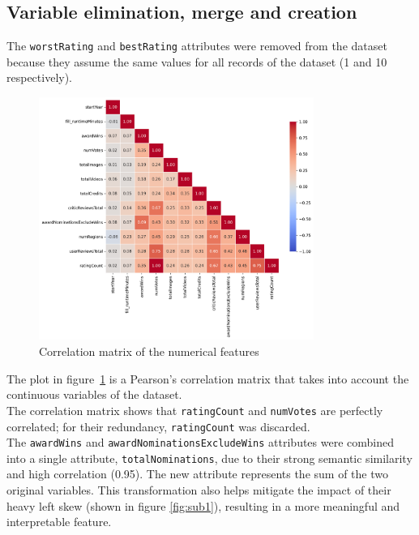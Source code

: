 \subsection{Variable elimination, merge and creation}\label{sec:var_elim_creation}
The \texttt{worstRating} and \texttt{bestRating} attributes were removed from the dataset because they
assume the same values for all records of the dataset (1 and 10 respectively).\\

\begin{figure}[H]
    \centering
    \includegraphics[width=0.8\textwidth]{plots/correlation_matrix.png}
    \caption{Correlation matrix of the numerical features}
    \label{fig:correlation_matrix}
\end{figure}

The plot in figure~\ref{fig:correlation_matrix} is a Pearson's correlation matrix that takes into
account the continuous variables of the dataset.\\

The correlation matrix shows that \texttt{ratingCount} and \texttt{numVotes} are perfectly correlated;
for their redundancy, \texttt{ratingCount} was discarded.\\

The \texttt{awardWins} and \texttt{awardNominationsExcludeWins} attributes were combined into a single
attribute, \texttt{totalNominations}, due to their strong semantic similarity and high correlation (0.95).
The new attribute represents the sum of the two original variables. This transformation also helps
mitigate the impact of their heavy left skew (shown in figure \ref{fig:sub1}), resulting in a more meaningful and interpretable feature.\\


